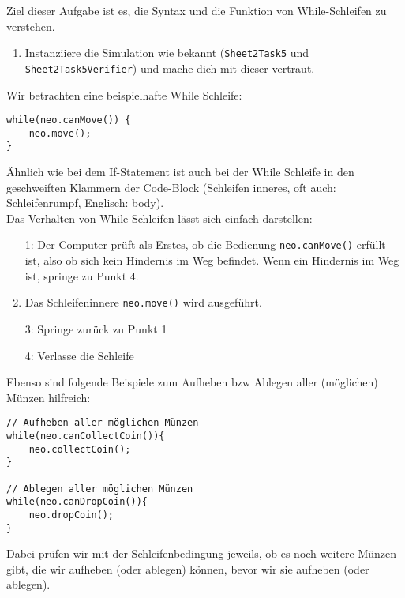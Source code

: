 

Ziel dieser Aufgabe ist es, die Syntax und die Funktion von While-Schleifen zu verstehen.

\begin{enumerate}
    \item Instanziiere die Simulation wie bekannt (\lstinline{Sheet2Task5} und \lstinline{Sheet2Task5Verifier}) und mache dich mit dieser vertraut.
\end{enumerate}


\begin{Infobox}
    Wir betrachten eine beispielhafte While Schleife:

    \begin{lstlisting}[breaklines=true, numbers=none]
while(neo.canMove()) {
    neo.move();
}
    \end{lstlisting}

    Ähnlich wie bei dem If-Statement ist auch bei der While Schleife in den geschweiften Klammern der Code-Block (Schleifen inneres, oft auch: Schleifenrumpf, Englisch: body).\\

    Das Verhalten von While Schleifen lässt sich einfach darstellen:
    \begin{enumerate}
        \item[1:] Der Computer prüft als Erstes, ob die Bedienung \lstinline{neo.canMove()} erfüllt ist, also ob sich kein Hindernis im Weg befindet. Wenn ein Hindernis im Weg ist, springe zu Punkt 4.
        \item[2:] Das Schleifeninnere \lstinline{neo.move()} wird ausgeführt.
        \item[3:] Springe zurück zu Punkt 1
        \item[4:] Verlasse die Schleife
    \end{enumerate}

    Ebenso sind folgende Beispiele zum Aufheben bzw Ablegen aller (möglichen) Münzen hilfreich:

    \begin{lstlisting}[breaklines=true, numbers=none]
// Aufheben aller möglichen Münzen
while(neo.canCollectCoin()){
    neo.collectCoin();
}

// Ablegen aller möglichen Münzen
while(neo.canDropCoin()){
    neo.dropCoin();
}
    \end{lstlisting}

    Dabei prüfen wir mit der Schleifenbedingung jeweils, ob es noch weitere Münzen gibt, die wir aufheben (oder ablegen) können, bevor wir sie aufheben (oder ablegen).
\end{Infobox}



